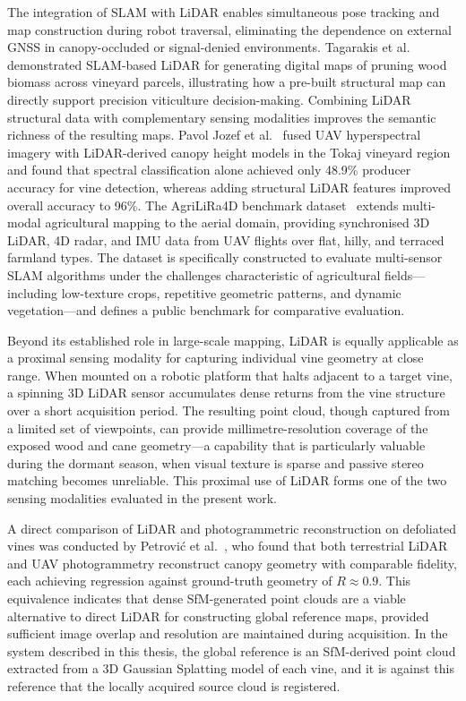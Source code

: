 The integration of SLAM with LiDAR enables simultaneous pose tracking and map construction during robot traversal, eliminating the dependence on external GNSS in canopy-occluded or signal-denied environments. Tagarakis et al.~\cite{tagarakisDigitalMappingPruning2026} demonstrated SLAM-based LiDAR for generating digital maps of pruning wood biomass across vineyard parcels, illustrating how a pre-built structural map can directly support precision viticulture decision-making. Combining LiDAR structural data with complementary sensing modalities improves the semantic richness of the resulting maps. Pavol Jozef et al.~\cite{pavoljozefsafarikuniversityinkosiceSynergisticUseLiDAR2025} fused UAV hyperspectral imagery with LiDAR-derived canopy height models in the Tokaj vineyard region and found that spectral classification alone achieved only 48.9\% producer accuracy for vine detection, whereas adding structural LiDAR features improved overall accuracy to 96\%. The AgriLiRa4D benchmark dataset~\cite{zhanAgriLiRa4DMultiSensorUAV2026} extends multi-modal agricultural mapping to the aerial domain, providing synchronised 3D LiDAR, 4D radar, and IMU data from UAV flights over flat, hilly, and terraced farmland types. The dataset is specifically constructed to evaluate multi-sensor SLAM algorithms under the challenges characteristic of agricultural fields---including low-texture crops, repetitive geometric patterns, and dynamic vegetation---and defines a public benchmark for comparative evaluation.

Beyond its established role in large-scale mapping, LiDAR is equally applicable as a proximal sensing modality for capturing individual vine geometry at close range. When mounted on a robotic platform that halts adjacent to a target vine, a spinning 3D LiDAR sensor accumulates dense returns from the vine structure over a short acquisition period. The resulting point cloud, though captured from a limited set of viewpoints, can provide millimetre-resolution coverage of the exposed wood and cane geometry---a capability that is particularly valuable during the dormant season, when visual texture is sparse and passive stereo matching becomes unreliable. This proximal use of LiDAR forms one of the two sensing modalities evaluated in the present work.

A direct comparison of LiDAR and photogrammetric reconstruction on defoliated vines was conducted by Petrović et al.~\cite{petrovicVineCanopyReconstruction2022}, who found that both terrestrial LiDAR and UAV photogrammetry reconstruct canopy geometry with comparable fidelity, each achieving regression against ground-truth geometry of $R \approx 0.9$. This equivalence indicates that dense SfM-generated point clouds are a viable alternative to direct LiDAR for constructing global reference maps, provided sufficient image overlap and resolution are maintained during acquisition. In the system described in this thesis, the global reference is an SfM-derived point cloud extracted from a 3D Gaussian Splatting model of each vine, and it is against this reference that the locally acquired source cloud is registered.

